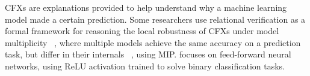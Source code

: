  CFXs are explanations provided to help understand why a machine learning model made a certain prediction. Some researchers use relational verification as a formal framework for reasoning the local robustness of CFXs under model multiplicity  ~\cite{CFXROBUSTNESS}, where multiple models achieve the same accuracy on a prediction task, but differ in their internals ~\cite{PREDICTIVEMULTIPICITY}, using MIP. \cite{CFXROBUSTNESS} focuses on feed-forward neural networks, using ReLU activation trained to solve binary classification tasks.
